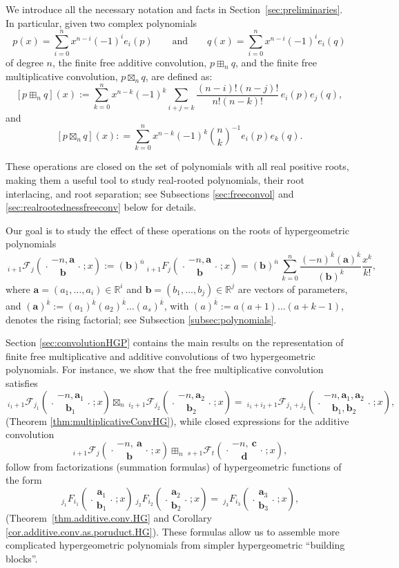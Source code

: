 \documentclass[reqno,11pt]{amsart}
\theoremstyle{remark}
\newcommand{\R}{\mathbb{R}}
\newcommand{\raising}[2]{\left(#1\right)^{\overline{#2}}}
\newcommand*\pFq[5]{%
 {\ }_{#1}{\mathcal F}_{#2}{\left(\genfrac..{0pt}{}{#3}{#4};#5\right)}%
}
\newcommand*\HGF[5]{%
 {\ }_{#1} F_{#2}{\left(\genfrac..{0pt}{}{#3}{#4};#5\right)}%
}
\begin{document}
We introduce all the necessary notation and facts in Section~\ref{sec:preliminaries}. In particular, given two complex  polynomials
\[
p(x)=\sum_{i=0}^n x^{n-i}(-1)^i e_i(p) \qquad \text{and} \qquad  q(x)=\sum_{i=0}^n x^{n-i}(-1)^i   e_i(q)
\]
of degree  $n$, the finite free additive convolution, $p\boxplus_n q$, and the finite free multiplicative  convolution, $p\boxtimes_n q$, are defined as:
$$ [p\boxplus_n q](x):=\sum_{k=0}^n x^{n-k}(-1)^k \sum_{i+j=k}\frac{(n-i)!(n-j)!}{n!(n-k)!}\, e_i(p) e_j(q), $$
and
$$
[p\boxtimes_n q](x): =\sum_{k=0}^n x^{n-k}(-1)^k \binom{n}{k}^{-1}  e_i(p) e_k(q)  .
$$

These operations are closed on the set of polynomials with all real positive roots, making them a useful tool to study real-rooted polynomials, their root interlacing, and root separation; see Subsections \ref{sec:freeconvol}  and \ref{sec:realrootednessfreeconv} below for details.

Our goal is to study the effect of these operations on the roots of hypergeometric polynomials
$$
\pFq{i+1}{j}{-n, \bm a}{\bm b }{x} :=\raising{\bm b}{n} \HGF{i+1}{j}{-n , \bm a}{\bm b }{x}= \raising{\bm b}{n} \, \sum_{k=0}^n \frac{\raising{-n}{k} \raising{\bm a}{k}}{\raising{\bm b}{k}} \frac{x^k}{k !}, 
$$
where $\bm a =(a_1, \dots, a_i)\in \R^i$ and $\bm b =(b_1, \dots, b_j)\in \R^j$ are vectors of parameters, and $\raising{\bm a}{k}:=\raising{a_1}{k}\raising{a_2}{k} \dots \raising{a_s}{k}$, with $\raising{a}{k}:=a(a+1)\dots(a+k-1)$, denotes the rising factorial; see Subsection \ref{subsec:polynomials}.

Section \ref{sec:convolutionHGP} contains the main results on the representation of finite free multiplicative and additive convolutions of two hypergeometric polynomials. For instance, we show that the free multiplicative convolution satisfies
$$
\pFq{i_1+1}{j_1}{-n, \bm a_1}{\bm b_1}{x} \boxtimes_n \pFq{i_2+1}{j_2}{-n, \bm a_2}{\bm b_2}{x}=\pFq{i_1+i_2+1}{j_1+j_2}{-n, \bm a_1, \bm a_2}{\bm b_1,\bm b_2}{x},
$$
(Theorem \ref{thm:multiplicativeConvHG}), while closed expressions for the additive convolution 
$$\pFq{i+1}{j}{-n,\ \bm a}{\bm b }{ x}\boxplus_n \pFq{s +1}{t}{-n,\ \bm c}{\bm d}{ x},$$
follow from factorizations (summation formulas) of hypergeometric functions of the form
$$
    \HGF{j_1}{i_1}{\bm a_1}{\bm b_1}{x}  \HGF{j_2}{i_2}{\bm a_2}{\bm b_2}{ x}=\HGF{j_3}{i_3}{\bm a_3}{\bm b_3}{x},
$$
(Theorem~\ref{thm.additive.conv.HG} and Corollary \ref{cor.additive.conv.as.poruduct.HG}). 
These formulas allow us to assemble more complicated hypergeometric polynomials from simpler hypergeometric ``building blocks''. 
\end{document}
